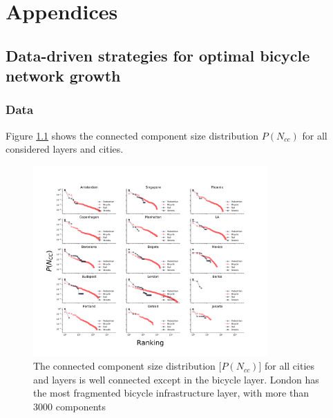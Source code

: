 \chapter{Appendices}

\section{Data-driven strategies for optimal bicycle network growth}
\subsection{Data}

Figure \ref{fig:Nodes} shows the connected component size distribution $P(N_{cc})$ for all considered layers and cities.

\begin{figure}[h!]
  \centering
  \includegraphics[width=0.8\textwidth]{images/datadriven/Nodes_cc.png}
  \caption[Connected component size distribution for analyzed cities]{The connected component size distribution [$P(N_{cc})$] for all cities and layers is well connected except in the bicycle layer. London has the most fragmented bicycle infrastructure layer, with more than 3000 components}
  \label{fig:Nodes}
\end{figure}



